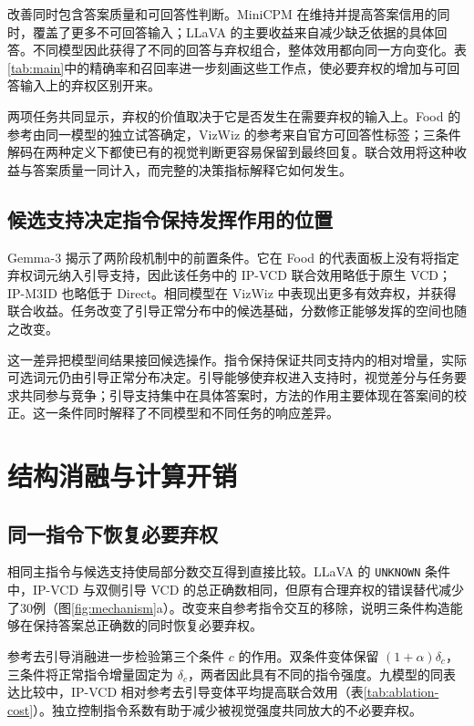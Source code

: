 \documentclass[11pt,twocolumn,a4paper]{article}
\begin{document}
改善同时包含答案质量和可回答性判断。MiniCPM 在维持并提高答案信用的同时，覆盖了更多不可回答输入；LLaVA 的主要收益来自减少缺乏依据的具体回答。不同模型因此获得了不同的回答与弃权组合，整体效用都向同一方向变化。表\ref{tab:main}中的精确率和召回率进一步刻画这些工作点，使必要弃权的增加与可回答输入上的弃权区别开来。

两项任务共同显示，弃权的价值取决于它是否发生在需要弃权的输入上。Food 的参考由同一模型的独立试答确定，VizWiz 的参考来自官方可回答性标签；三条件解码在两种定义下都使已有的视觉判断更容易保留到最终回复。联合效用将这种收益与答案质量一同计入，而完整的决策指标解释它如何发生。



\subsection{候选支持决定指令保持发挥作用的位置}
Gemma-3 揭示了两阶段机制中的前置条件。它在 Food 的代表面板上没有将指定弃权词元纳入引导支持，因此该任务中的 IP-VCD 联合效用略低于原生 VCD；IP-M3ID 也略低于 Direct。相同模型在 VizWiz 中表现出更多有效弃权，并获得联合收益。任务改变了引导正常分布中的候选基础，分数修正能够发挥的空间也随之改变。

这一差异把模型间结果接回候选操作。指令保持保证共同支持内的相对增量，实际可选词元仍由引导正常分布决定。引导能够使弃权进入支持时，视觉差分与任务要求共同参与竞争；引导支持集中在具体答案时，方法的作用主要体现在答案间的校正。这一条件同时解释了不同模型和不同任务的响应差异。

\section{结构消融与计算开销}
\subsection{同一指令下恢复必要弃权}
相同主指令与候选支持使局部分数交互得到直接比较。LLaVA 的 \mbox{\texttt{UNKNOWN}} 条件中，IP-VCD 与双侧引导 VCD 的总正确数相同，但原有合理弃权的错误替代减少了30例（图\ref{fig:mechanism}a）。改变来自参考指令交互的移除，说明三条件构造能够在保持答案总正确数的同时恢复必要弃权。

参考去引导消融进一步检验第三个条件 $c$ 的作用。双条件变体保留 $(1+\alpha)\delta_c$，三条件将正常指令增量固定为 $\delta_c$，两者因此具有不同的指令强度。九模型的同表达比较中，IP-VCD 相对参考去引导变体平均提高联合效用（表\ref{tab:ablation-cost}）。独立控制指令系数有助于减少被视觉强度共同放大的不必要弃权。
\end{document}
